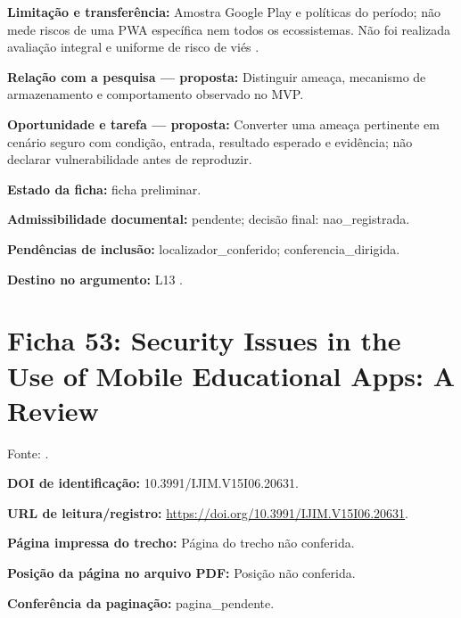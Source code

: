 \noindent\textbf{Limitação e transferência:} Amostra Google Play e políticas do período; não mede riscos de uma PWA específica nem todos os ecossistemas. Não foi realizada avaliação integral e uniforme de risco de viés \citep{OS17}.\par\medskip

\noindent\textbf{Relação com a pesquisa — proposta:} Distinguir ameaça, mecanismo de armazenamento e comportamento observado no MVP.\par\medskip

\noindent\textbf{Oportunidade e tarefa — proposta:} Converter uma ameaça pertinente em cenário seguro com condição, entrada, resultado esperado e evidência; não declarar vulnerabilidade antes de reproduzir.\par\medskip

\noindent\textbf{Estado da ficha:} ficha preliminar.\par\medskip

\noindent\textbf{Admissibilidade documental:} pendente; decisão final: nao\_registrada.\par\medskip

\noindent\textbf{Pendências de inclusão:} localizador\_conferido; conferencia\_dirigida.\par\medskip

\noindent\textbf{Destino no argumento:} L13 .

\clearpage\section*{Ficha 53: Security Issues in the Use of Mobile Educational Apps: A Review}

Fonte: \citet{OS18}.

\noindent\textbf{DOI de identificação:} 10.3991/IJIM.V15I06.20631.\par\medskip

\noindent\textbf{URL de leitura/registro:} \url{https://doi.org/10.3991/IJIM.V15I06.20631}.\par\medskip

\noindent\textbf{Página impressa do trecho:} Página do trecho não conferida.\par\medskip

\noindent\textbf{Posição da página no arquivo PDF:} Posição não conferida.\par\medskip

\noindent\textbf{Conferência da paginação:} pagina\_pendente.\par\medskip

